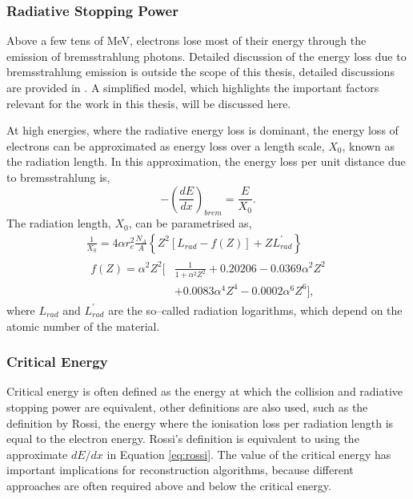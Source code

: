 \subsubsection*{Radiative Stopping Power}
Above a few tens of MeV, electrons lose most of their energy through the 
emission of bremsstrahlung photons. Detailed discussion of the energy loss due
to bremsstrahlung emission is outside the scope of this thesis, detailed
discussions are provided in \cite{PhysRevD.98.030001, Tsai:1973py}. A simplified
model, which highlights the important factors relevant for the work in this 
thesis, will be discussed here.

At high energies, where the radiative energy loss is dominant, the energy loss
of electrons can be approximated as energy loss over a length scale, $X_0$,
known as the radiation length. In this approximation, the energy loss per 
unit distance due to bremsstrahlung is, 
\begin{equation}
	- \left( \frac{dE}{dx} \right)_{brem} = \frac{E}{X_0}.
	\label{eq:rossi}
\end{equation}
The radiation length, $X_0$, can be parametrised as,
\begin{equation}
	\begin{gathered}
		\frac{1}{X_0} = 4 \alpha r_e^2 \frac{N_A}{A} \left\{ Z^2 \left[L_{rad} - f(Z)\right] + Z
		L^\prime_{rad} \right\} \\
		\begin{aligned}
			f(Z) = \alpha^2 Z^2 \bigg[ &\frac{1}{1 + \alpha^2 Z^2} + 0.20206 - 0.0369
			\alpha^2 Z^2 \\ &+ 0.0083 \alpha^4 Z^4 -0.0002 \alpha^6 Z^6 \bigg],
		\end{aligned}
	\end{gathered}
	\label{eq:rad_length}
\end{equation}
where $L_{rad}$ and $L_{rad}^\prime$ are the so--called radiation logarithms,
which depend on the atomic number of the material\cite{Tsai:1973py}.

\subsubsection*{Critical Energy}
Critical energy is often defined as the energy at which the collision and 
radiative stopping power are equivalent, other definitions are also used, such
as the definition by Rossi, the energy where the ionisation loss per
radiation length is equal to the electron energy\cite{Rossi:1952kt}. Rossi's 
definition is equivalent to using the approximate $dE/dx$ in Equation 
\ref{eq:rossi}\cite{PhysRevD.98.030001}. The value of the critical energy has 
important implications for reconstruction algorithms, because different 
approaches are often required above and below the critical energy. 


